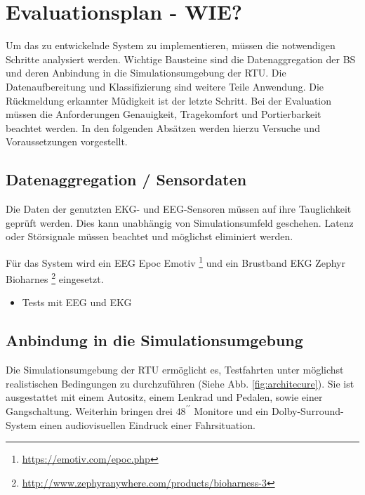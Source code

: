 {\section{Evaluationsplan - WIE?}
\label{chap:eval}
Um das zu entwickelnde System zu implementieren, müssen die notwendigen Schritte analysiert werden. Wichtige Bausteine sind die Datenaggregation der \acl{BS} und deren Anbindung in die Simulationsumgebung der \acl{RTU}. Die Datenaufbereitung und Klassifizierung sind weitere Teile Anwendung. Die Rückmeldung erkannter Müdigkeit ist der letzte Schritt. Bei der Evaluation müssen die Anforderungen Genauigkeit, Tragekomfort und Portierbarkeit beachtet werden. In den folgenden Absätzen werden hierzu Versuche und Voraussetzungen vorgestellt.


\subsection{Datenaggregation / Sensordaten}
Die Daten der genutzten EKG- und EEG-Sensoren müssen auf ihre Tauglichkeit geprüft werden. Dies kann unabhängig von Simulationsumfeld geschehen. Latenz oder Störsignale müssen beachtet und möglichst eliminiert werden. 

Für das System wird ein EEG Epoc Emotiv \footnote{\url{https://emotiv.com/epoc.php}} und ein Brustband EKG Zephyr Bioharnes \footnote{\url{http://www.zephyranywhere.com/products/bioharness-3}} eingesetzt. \\
\begin{itemize}
	\item Tests mit EEG und EKG
\end{itemize}

\subsection{Anbindung in die Simulationsumgebung}
Die Simulationsumgebung der \acl{RTU} ermöglicht es, Testfahrten unter möglichst realistischen Bedingungen zu durchzuführen (Siehe Abb. \ref{fig:architecure}). Sie ist ausgestattet mit einem Autositz, einem Lenkrad und Pedalen, sowie einer Gangschaltung. Weiterhin bringen drei $48^{\prime\prime}$ Monitore und ein Dolby-Surround-System einen audiovisuellen Eindruck einer Fahrsituation.

}
